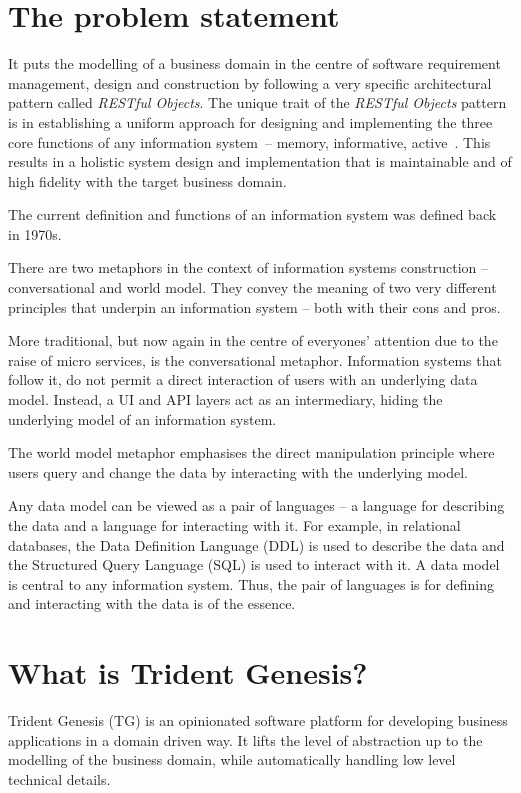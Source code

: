 \documentclass[a4paper,12pt,oneside,openright,final]{memoir} %
\begin{document}
\section*{The problem statement}

	It puts the modelling of a business domain in the centre of software requirement management, design and construction by following a very specific architectural pattern called \emph{RESTful Objects}.
	The unique trait of the \emph{RESTful Objects} pattern is in establishing a uniform approach for designing and implementing the three core functions of any information system~-- memory, informative, active~\cite{oli2007}.
	This results in a holistic system design and implementation that is maintainable and of high fidelity with the target business domain.

	The current definition and functions of an information system was defined back in 1970s.
	

	
	There are two metaphors in the context of information systems construction -- conversational and world model.
	They convey the meaning of two very different principles that underpin an information system -- both with their cons and pros.
	
	More traditional, but now again in the centre of everyones' attention due to the raise of micro services, is the conversational metaphor.
	Information systems that follow it, do not permit a direct interaction of users with an underlying data model.
	Instead, a UI and API layers act as an intermediary, hiding the underlying model of an information system.
	
	The world model metaphor emphasises the direct manipulation principle where users query and change the data by interacting with the underlying model.
	
	Any data model can be viewed as a pair of languages -- a language for describing the data and a language for interacting with it.
	For example, in relational databases, the Data Definition Language (DDL) is used to describe the data and the Structured Query Language (SQL) is used to interact with it.
	A data model is central to any information system.
	Thus, the pair of languages is for defining and interacting with the data is of the essence.



\section*{What is Trident Genesis?}
  Trident Genesis (TG) is an opinionated software platform for developing business applications in a domain driven way.
  It lifts the level of abstraction up to the modelling of the business domain, while automatically handling low level technical details.
  
\end{document}
